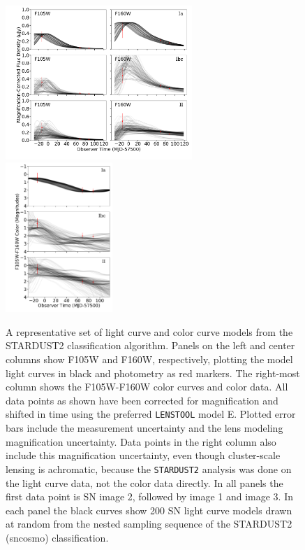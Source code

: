 \documentclass[12pt]{article}
\def\lenstool{{\tt LENSTOOL}\xspace}
\begin{document}
\begin{figure}
    \centering
\vspace{0pt} \includegraphics[width=0.63\textwidth]{Paper/Figures/lightcurves_NSAMPLES.pdf} 
\vspace{0pt} \includegraphics[width=0.36\textwidth]{Paper/Figures/colorcurves_NSAMPLES.pdf}
    \caption{
    A representative set of light curve and color curve models from the STARDUST2 classification algorithm.  Panels on the left and center columns show  F105W and F160W, respectively, plotting the model light curves in black and photometry as red markers.  The right-most column shows the F105W-F160W color curves and color data. All data points 
    as shown have been corrected for magnification and shifted in time using the preferred \lenstool model E. Plotted error bars include the measurement uncertainty and the lens modeling magnification uncertainty. Data points in the right column also include this magnification uncertainty, even though cluster-scale lensing is achromatic, because the {\tt STARDUST2} analysis was done on the light curve data, not the color data directly. In all panels the first data point is SN image 2, followed by image 1 and image 3. In each panel the black curves show 200 SN light curve models drawn at random from the nested sampling sequence of the STARDUST2 (sncosmo) classification.    
    \label{fig:classification_lightcurves}
    }
\end{figure}
\end{document}

